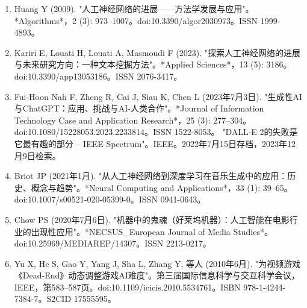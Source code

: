\begin{enumerate}
\item Huang Y (2009). "人工神经网络的进展——方法学发展与应用"。*Algorithms*，2 (3): 973–1007。doi:10.3390/algor2030973。ISSN 1999-4893。  
\item Kariri E, Louati H, Louati A, Masmoudi F (2023). "探索人工神经网络的进展与未来研究方向：一种文本挖掘方法"。*Applied Sciences*，13 (5): 3186。doi:10.3390/app13053186。ISSN 2076-3417。  
\item Fui-Hoon Nah F, Zheng R, Cai J, Siau K, Chen L (2023年7月3日). "生成性AI与ChatGPT：应用、挑战与AI-人类合作"。*Journal of Information Technology Case and Application Research*，25 (3): 277–304。doi:10.1080/15228053.2023.2233814。ISSN 1522-8053。  
"DALL-E 2的失败是它最有趣的部分 – IEEE Spectrum"。IEEE。2022年7月15日存档，2023年12月9日检索。  
\item Briot JP (2021年1月). "从人工神经网络到深度学习在音乐生成中的应用：历史、概念与趋势"。*Neural Computing and Applications*，33 (1): 39–65。doi:10.1007/s00521-020-05399-0。ISSN 0941-0643。  
\item Chow PS (2020年7月6日). "机器中的鬼魂（好莱坞机器）：人工智能在电影行业的出现性应用"。*NECSUS_European Journal of Media Studies*。doi:10.25969/MEDIAREP/14307。ISSN 2213-0217。  
\item Yu X, He S, Gao Y, Yang J, Sha L, Zhang Y, 等人 (2010年6月). "为视频游戏《Dead-End》动态调整游戏AI难度"。第三届国际信息科学与交互科学会议，IEEE，第583–587页。doi:10.1109/icicis.2010.5534761。ISBN 978-1-4244-7384-7。S2CID 17555595。
\end{enumerate}